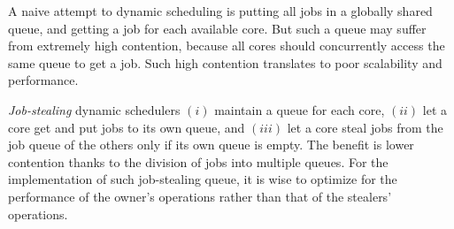 \documentclass[11pt,a4paper,oneside,microtype,chapter,nokorean]{oblivoir}
\begin{document}
A naive attempt to dynamic scheduling is putting all jobs in a globally shared queue, and getting a
job for each available core.  But such a queue may suffer from extremely high contention, because
all cores should concurrently access the same queue to get a job.  Such high contention translates
to poor scalability and performance.

\emph{Job-stealing} dynamic schedulers $(i)$ maintain a queue for each core, $(ii)$ let a core get
and put jobs to its own queue, and $(iii)$ let a core steal jobs from the job queue of the others
only if its own queue is empty.  The benefit is lower contention thanks to the division of jobs into
multiple queues.  For the implementation of such job-stealing queue, it is wise to optimize for the
performance of the owner's operations rather than that of the stealers' operations.
\end{document}
